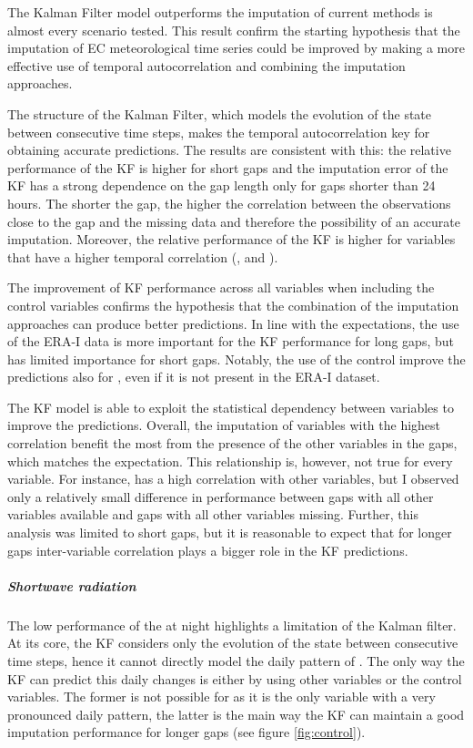 \documentclass{article}
\begin{document}
The Kalman Filter model outperforms the imputation of current methods is almost every scenario tested. This result confirm the starting hypothesis that the imputation of EC meteorological time series could be improved by making a more effective use of temporal autocorrelation and combining the imputation approaches.

The structure of the Kalman Filter, which models the evolution of the state between consecutive time steps, makes the temporal autocorrelation key for obtaining accurate predictions. The results are consistent with this: the relative performance of the KF is higher for short gaps and the imputation error of the KF has a strong dependence on the gap length only for gaps shorter than 24 hours.  The shorter the gap, the higher the correlation between the observations close to the gap and the missing data and therefore the possibility of an accurate imputation. Moreover, the relative performance of the KF is higher for variables that have a higher temporal correlation (,  and ).

The improvement of KF performance across all variables when including the control variables confirms the hypothesis that the combination of the imputation approaches can produce better predictions. In line with the expectations, the use of the ERA-I data is more important for the KF performance for long gaps, but has limited importance for short gaps. Notably, the use of the control improve the predictions also for , even if it is not present in the ERA-I dataset.

The KF model is able to exploit the statistical dependency between variables to improve the predictions. Overall, the imputation of variables with the highest correlation benefit the most from the presence of the other variables in the gaps, which matches the expectation. This relationship is, however, not true for every variable. For instance,  has a high correlation with other variables, but I observed only a relatively small difference in performance between gaps with all other variables available and gaps with all other variables missing.
Further, this analysis was limited to short gaps, but it is reasonable to expect that for longer gaps inter-variable correlation plays a bigger role in the KF predictions.

\subparagraph{Shortwave radiation} The low performance of the  at night highlights a limitation of the Kalman filter.  At its core, the KF considers only the evolution of the state between consecutive time steps, hence it cannot directly model the daily pattern of . The only way the KF can predict this daily changes is either by using other variables or the control variables. The former is not possible for  as it is the only variable with a very pronounced daily pattern, the latter is the main way the KF can maintain a good imputation performance for longer gaps (see figure \ref{fig:control}).
\end{document}
